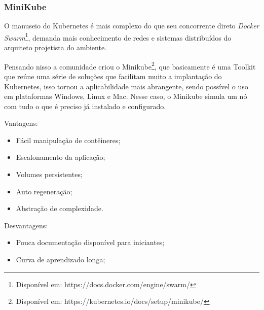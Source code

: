 \subsubsection{MiniKube}
O manuseio do Kubernetes é mais complexo do que seu concorrente direto \textit{Docker Swarm}\footnote{Disponível em: https://docs.docker.com/engine/swarm/}, demanda mais conhecimento de redes e sistemas distribuídos do arquiteto projetista do ambiente.

Pensando nisso a comunidade criou o Minikube\footnote{Disponível em: https://kubernetes.io/docs/setup/minikube/}, que basicamente é uma Toolkit que reúne uma série de soluções que facilitam muito a implantação do Kubernetes, isso tornou a aplicabilidade mais abrangente, sendo possível o uso em plataformas Windows, Linux e Mac. Nesse caso, o Minikube simula um nó com tudo o que é preciso já instalado e configurado.


Vantagens:
\begin{itemize}
\item Fácil manipulação de contêineres;
\item Escalonamento da aplicação;
\item Volumes persistentes;
\item Auto regeneração;
\item Abstração de complexidade.
\end{itemize}

Desvantagens:
\begin{itemize}
\item Pouca documentação disponível para iniciantes;
\item Curva de aprendizado longa;

\end{itemize}



